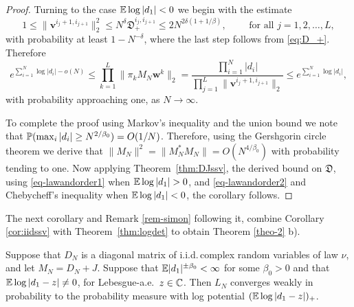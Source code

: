 \documentclass{amsart}
\numberwithin{equation}{section}
\def\corEE{\textcolor{amethyst}}
\def\corEE{}
\def\corAB{}
\begin{document}
\begin{proof}
 \corAB{Turning to the case $\Exp \log |d_1| < 0$ we begin with the estimate}
  \[
    1
    \leq \|{\bm v}^{i_j+1,i_{j+1}}\|^2_2
    \leq N^{\delta} \corAB{\mathfrak{D}_+^{i_j,i_{j+1}} \le 2 N^{2\delta(1+1/\beta)}, \qquad \text{ for all } j =1,2,\ldots,L,}
  \]
  \corAB{with probability at least $1-N^{-\delta}$, where the last step follows from \eqref{eq:D_+}. Therefore}
  \begin{equation}
    \label{eq-lawandorder2}
    \corAB{e^{\sum_{i=1}^N \log|d_i| -o(N)}
    \leq
    \prod_{k=1}^L \|\pi_k M_N {\bm w}^{k}\|_2= \frac{\prod_{i=1}^N |d_i|}{\prod_{j=1}^L \|{\bm v}^{i_j+1,i_{j+1}}\|_2}
    \leq
    e^{\sum_{i=1}^N \log|d_i|},}
  \end{equation}
  \corAB{with probability approaching one, as $N \to \infty$.}


\corAB{To complete the proof using Markov's inequality and the union bound we note that $\P(\max_i |d_i| \ge N^{2/\beta_0}) =O(1/N)$.
\corEE{Therefore, using the Gershgorin circle theorem we derive that $\|M_N\|^2 = \|M_N^*M_N\| = O(N^{4/\beta_0})$ with probability tending to one.} Now applying Theorem~\ref{thm:DJssv}, the derived bound on $\mathfrak{D}$}, using \eqref{eq-lawandorder1} when $\E\log |d_1|>0$, and \eqref{eq-lawandorder2} \corAB{and Chebycheff's inequality} when $\E\log |d_1|<0$, the corollary follows.
  \end{proof}

  The next corollary and Remark \ref{rem-simon} following it,
  combine Corollary \ref{cor:iidssv}
with Theorem~\ref{thm:logdet} to obtain Theorem \ref{theo-2} b).
  \begin{corollary}
    \label{cor:iid}  Suppose that
    $D_N$ is a diagonal matrix of i.i.d.\,complex random variables of law $\nu$,
    and let $M_N=D_N+J$.  Suppose that
    $\Exp |d_1|^{\pm \beta_0} < \infty$ for some $\beta_0> 0$ and that
    $\Exp\log|d_1 - z|\neq 0$,  for Lebesgue-a.e.~$z \in \C$.  Then \corAB{$L_N$}
   converges weakly in probability to the probability measure with
   log potential $(\Exp \log| d_1 - z|)_+$.
  \end{corollary}
\end{document}

